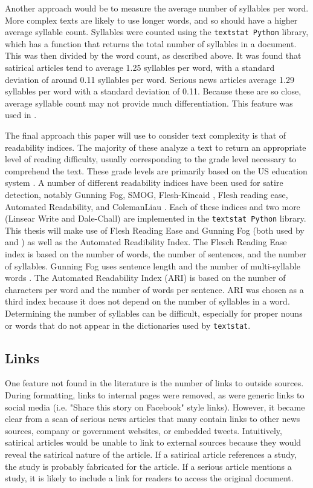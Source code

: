 \documentclass [12 pt] {report}
\begin{document}
Another approach would be to measure the average number of syllables per word. More complex texts are likely to use longer words, and so should have a higher average syllable count. Syllables were counted using the \texttt{textstat Python} library, which has a function that returns the total number of syllables in a document. This was then divided by the word count, as described above. It was found that satirical articles tend to average 1.25 syllables per word, with a standard deviation of around 0.11 syllables per word. Serious news articles average 1.29 syllables per word with a standard deviation of 0.11. Because these are so close, average syllable count may not provide much differentiation. This feature was used in \cite{Yang}.

The final approach this paper will use to consider text complexity is that of readability indices. The majority of these analyze a text to return an appropriate level of reading difficulty, usually corresponding to the grade level necessary to comprehend the text. These grade levels are primarily based on the US education system \cite{indices}. A number of different readability indices have been used for satire detection, notably Gunning Fog, SMOG, Flesh-Kincaid \cite{Horne}, Flesh reading ease, Automated Readability, and ColemanLiau \cite{Yang}. Each of these indices and two more (Linsear Write and Dale-Chall) are implemented in the \texttt{textstat Python} library. This thesis will make use of Flesh Reading Ease and Gunning Fog (both used by \cite{Horne} and \cite{Yang}) as well as the Automated Readibility Index. The Flesch Reading Ease index is based on the number of words, the number of sentences, and the number of syllables. Gunning Fog uses sentence length and the number of multi-syllable words \cite{indices}. The Automated Readability Index (ARI) is based on the number of characters per word and the number of words per sentence. ARI was chosen as a third index because it does not depend on the number of syllables in a word. Determining the number of syllables can be difficult, especially for proper nouns or words that do not appear in the dictionaries used by \texttt{textstat}.

\subsection{Links}
One feature not found in the literature is the number of links to outside sources. During formatting, links to internal pages were removed, as were generic links to social media (i.e. "Share this story on Facebook" style links). However, it became clear from a scan of serious news articles that many contain links to other news sources, company or government websites, or embedded tweets. Intuitively, satirical articles would be unable to link to external sources because they would reveal the satirical nature of the article. If a satirical article references a study, the study is probably fabricated for the article. If a serious article mentions a study, it is likely to include a link for readers to access the original document.
\end{document}
